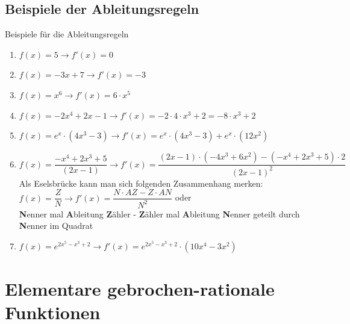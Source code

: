 \subsection{Beispiele der Ableitungsregeln}\label{Ableitungen}
\begin{bsp}{Beispiele für die Ableitungsregeln}{}
\begin{enumerate}
    \item $f(x) = 5 \longrightarrow f'(x) = 0$
    \item $f(x) = -3x +7 \longrightarrow f'(x) = -3 $
    \item $f(x) = x^6 \longrightarrow f'(x) = 6\cdot x^5$
    \item $f(x) = -2x^4+2x-1 \longrightarrow f'(x) = -2\cdot 4\cdot x^3 + 2 = -8\cdot x^3 +2$
    \item $f(x) = e^x \cdot (4x^3 -3) \longrightarrow f'(x) = e^x \cdot (4x^3-3) + e^x \cdot (12x^2)$
    \item $f(x) = \dfrac{-x^4+ 2x^3 + 5 }{(2x-1)} \longrightarrow f'(x) = \dfrac{(2x-1)\cdot (-4x^3+6x^2) - (-x^4 +2x^3 + 5)\cdot 2 }{(2x-1)^2}$ \\[0.2cm]
    Als Eselsbrücke kann man sich folgenden Zusammenhang merken: \\[0.2cm]
    $f(x) = \dfrac{Z}{N} \longrightarrow f'(x) = \dfrac{N\cdot AZ - Z\cdot AN}{N^2}$ oder\\[0.2cm]  {\bfseries\color{red}N}enner mal {\bfseries\color{red}A}bleitung {\bfseries\color{red}Z}ähler - {\bfseries\color{red}Z}ähler mal {\bfseries\color{red}A}bleitung {\bfseries\color{red}N}enner geteilt durch {\bfseries\color{red}N}enner im Quadrat
    \item $f(x)= e^{2x^5-x^3+2 }\longrightarrow f'(x) = e^{2x^5-x^3 + 2} \cdot (10x^4 -3x^2)$
\end{enumerate}
\end{bsp}
\section{Elementare gebrochen-rationale Funktionen} 
